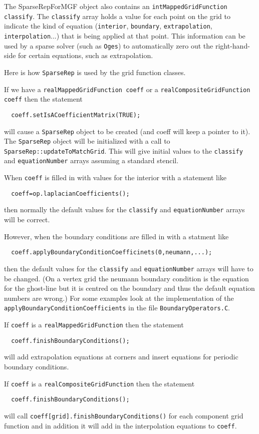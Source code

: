 The {\ff SparseRepForMGF} object also contains an {\tt intMappedGridFunction classify}.
The {\tt classify} array holds a value for each point on the grid to indicate the
kind of equation ({\tt interior}, {\tt boundary}, {\tt extrapolation}, {\tt interpolation}...)
that is being applied at that point. This information can be used by a sparse solver
(such as {\tt Oges}) to automatically zero out the right-hand-side for certain equations,
such as extrapolation.

Here is how {\tt SparseRep} is used by the grid function classes.

If we have a {\tt realMappedGridFunction coeff} or a {\tt realCompositeGridFunction coeff}
then the statement
\begin{verbatim}
  coeff.setIsACoefficientMatrix(TRUE);
\end{verbatim}
will cause a {\tt SparseRep} object to be created (and coeff will keep a pointer to it).
The {\tt SparseRep} object will be initialized with a call to {\tt SparseRep::updateToMatchGrid}.
This will give initial values to the {\tt classify} and {\tt equationNumber} arrays assuming
a standard stencil.

When {\tt coeff} is filled in with values for the interior with a statement like
\begin{verbatim}
  coeff=op.laplacianCoefficients();
\end{verbatim}
then normally the default values for the {\tt classify} and {\tt equationNumber} arrays
will be correct.

However, when the boundary conditions are filled in with a statment like
\begin{verbatim}
  coeff.applyBoundaryConditionCoefficinets(0,neumann,...);
\end{verbatim}
then the default values for the {\tt classify} and {\tt equationNumber} arrays will
have to be changed. (On a vertex grid the neumann boundary condition is the equation for the ghost-line
but it is centred on the boundary and thus the default equation numbers are wrong.)
For some examples look at the implementation of the
{\tt applyBoundaryConditionCoefficients} in the file {\tt BoundaryOperators.C}.


If {\tt coeff} is a {\tt realMappedGridFunction} then the statement
\begin{verbatim}
  coeff.finishBoundaryConditions();
\end{verbatim}
will add extrapolation equations at corners and insert equations for periodic
boundary conditions.

If {\tt coeff} is a {\tt realCompositeGridFunction} then the statement
\begin{verbatim}
  coeff.finishBoundaryConditions();
\end{verbatim}
will call {\tt coeff[grid].finishBoundaryConditions()} for each component grid function
and in addition it will add in the interpolation equations to {\tt coeff}.







